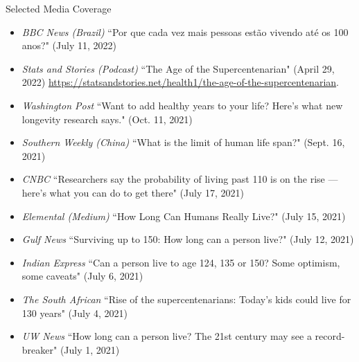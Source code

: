 \documentclass{resume} %
\begin{document}
\begin{rSection}{Selected Media Coverage}

\begin{itemize}
\item \textit{BBC News (Brazil)} ``Por que cada vez mais pessoas est\~{a}o vivendo at\'{e} os 100 anos?" (July 11, 2022)
\item \textit{Stats and Stories (Podcast)} ``The Age of the Supercentenarian" (April 29, 2022) \url{https://statsandstories.net/health1/the-age-of-the-supercentenarian}.
\item \textit{Washington Post} ``Want to add healthy years to your life? Here’s what new longevity research says." (Oct. 11, 2021)
\item \textit{Southern Weekly (China)} ``What is the limit of human life span?" (Sept. 16, 2021)
\item \textit{CNBC} ``Researchers say the probability of living past 110 is on the rise — here’s what you can do to get there" (July 17, 2021)
\item \textit{Elemental (Medium)} ``How Long Can Humans Really Live?" (July 15, 2021)
\item \textit{Gulf News} ``Surviving up to 150: How long can a person live?" (July 12, 2021)
\item \textit{Indian Express} ``Can a person live to age 124, 135 or 150? Some optimism, some caveats" (July 6, 2021)
\item \textit{The South African} ``Rise of the supercentenarians: Today’s kids could live for 130 years" (July 4, 2021)
\item \textit{UW News} ``How long can a person live? The 21st century may see a record-breaker" (July 1, 2021)
\end{itemize}

\end{rSection}
\end{document}
